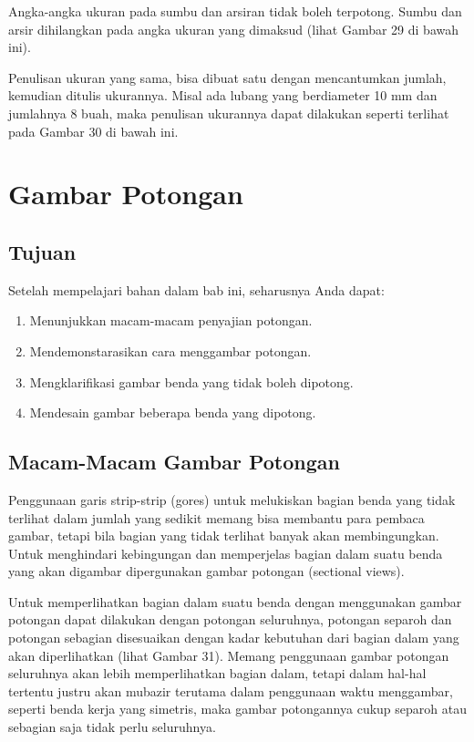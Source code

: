 \documentclass[11pt]{simart} %
\begin{document}
Angka-angka ukuran pada sumbu dan arsiran tidak boleh terpotong. Sumbu dan arsir dihilangkan pada angka ukuran yang dimaksud (lihat Gambar 29 di bawah ini).

Penulisan ukuran yang sama, bisa dibuat satu dengan mencantumkan jumlah, kemudian ditulis ukurannya. Misal ada lubang yang berdiameter 10 mm dan jumlahnya 8 buah, maka penulisan ukurannya dapat dilakukan seperti terlihat pada Gambar 30 di bawah ini.

\section{Gambar Potongan}

\subsection*{Tujuan}
Setelah mempelajari bahan dalam bab ini, seharusnya Anda dapat:
\begin{enumerate}
	\item Menunjukkan macam-macam penyajian potongan.
	\item Mendemonstarasikan cara menggambar potongan.
	\item Mengklarifikasi gambar benda yang tidak boleh dipotong.
	\item Mendesain gambar beberapa benda yang dipotong.
\end{enumerate}

\subsection{Macam-Macam Gambar Potongan}
Penggunaan garis strip-strip (gores) untuk melukiskan bagian benda yang tidak terlihat dalam jumlah yang sedikit memang bisa membantu para pembaca gambar, tetapi bila bagian yang tidak terlihat banyak akan membingungkan. Untuk menghindari kebingungan dan memperjelas bagian dalam suatu benda yang akan digambar dipergunakan gambar potongan (sectional views).

Untuk memperlihatkan bagian dalam suatu benda dengan menggunakan gambar potongan dapat dilakukan dengan potongan seluruhnya, potongan separoh dan potongan sebagian disesuaikan dengan kadar kebutuhan dari bagian dalam yang akan diperlihatkan (lihat Gambar 31). Memang penggunaan gambar potongan seluruhnya akan lebih memperlihatkan bagian dalam, tetapi dalam hal-hal tertentu justru akan mubazir terutama dalam penggunaan waktu menggambar, seperti benda kerja yang simetris, maka gambar potongannya cukup separoh atau sebagian saja tidak perlu seluruhnya.
\end{document}
